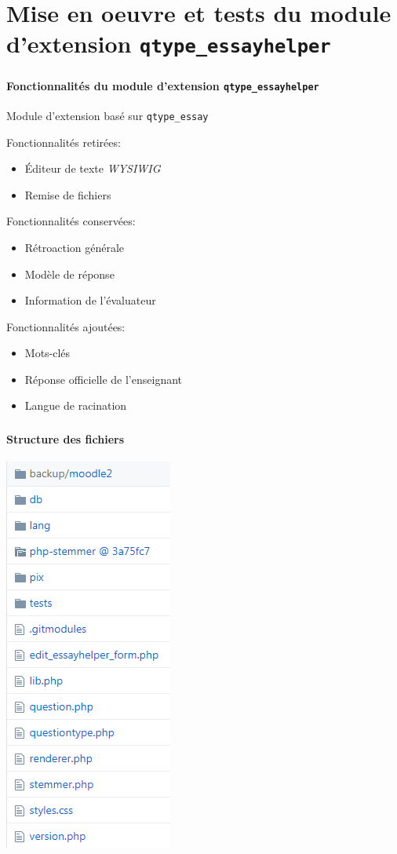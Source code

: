 \documentclass{beamer}
\begin{document}
  \section[Mise en oeuvre]{Mise en oeuvre et tests du module d'extension \texttt{qtype\_essayhelper}}
  \begin{frame}
  \frametitle{\insertsection}
  \framesubtitle{Fonctionnalit\'es du module d'extension \texttt{qtype\_essayhelper}}
  Module d'extension bas\'e sur \texttt{qtype\_essay}
  
  Fonctionnalit\'es retir\'ees:
  \begin{itemize}
    \item \'Editeur de texte \textit{WYSIWIG}
    \item Remise de fichiers
  \end{itemize}
  
  Fonctionnalit\'es conserv\'ees:
  \begin{itemize}
    \item R\'etroaction g\'en\'erale
    \item Mod\`ele de r\'eponse
    \item Information de l'\'evaluateur
  \end{itemize}
  
  Fonctionnalit\'es ajout\'ees:
  \begin{itemize}
    \item Mots-cl\'es
    \item R\'eponse officielle de l'enseignant
    \item Langue de racination
  \end{itemize}
  \end{frame}
  
  \begin{frame}
  \frametitle{\insertsection}
  \framesubtitle{Structure des fichiers}
  \begin{center}
    \includegraphics[scale=0.5]{../images/architecture.png}
  \end{center}
  \end{frame}
  
\end{document}

